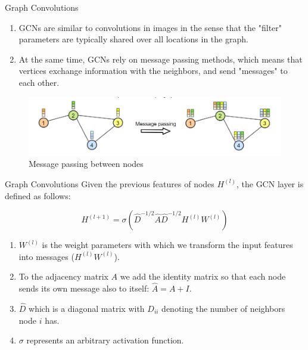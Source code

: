 \documentclass{beamer}
\begin{document}
	\begin{frame}[t]{Graph Convolutions}\vspace{4pt}
	\begin{enumerate}
		\item GCNs are similar to convolutions in images in the sense that the "filter" parameters are typically shared over all locations in the graph. 
		\item At the same time, GCNs rely on message passing methods, which means that vertices exchange information with the neighbors, and send "messages" to each other.
	\end{enumerate}
	
	\begin{figure}
		\centering
		\includegraphics[scale=0.4]{sg2.png}
		\caption{Message passing between nodes}
	\end{figure}
	\end{frame}

	\begin{frame}[t]{Graph Convolutions}\vspace{4pt}
	Given the previous features of nodes $H^{(l)}$, the GCN layer is defined as follows:
	
	$$H^{(l+1)} = \sigma\left(\hat{D}^{-1/2}\hat{A}\hat{D}^{-1/2}H^{(l)}W^{(l)}\right)$$
	\begin{enumerate}
		\item $W^{(l)}$ is the weight parameters with which we transform the input features into messages ($H^{(l)}W^{(l)}$). 
		\item To the adjacency matrix $A$ we add the identity matrix so that each node sends its own message also to itself: $\hat{A}=A+I$. 
		\item $\hat{D}$ which is a diagonal matrix with $D_{ii}$ denoting the number of neighbors node $i$ has. 
		\item $\sigma$ represents an arbitrary activation function.
	\end{enumerate}
	\end{frame}
\end{document}
